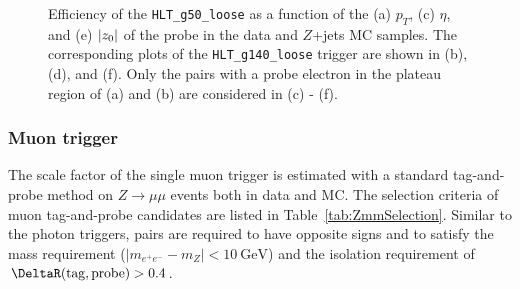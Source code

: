 \begin{figure}[!htb]
    \caption{Efficiency of the \texttt{HLT\_g50\_loose} as a function of the (a) $p_{T}$, (c) $\eta$, and (e) $|z_{0}|$ of the probe in the data and $Z$+jets MC samples. The corresponding plots of the \texttt{HLT\_g140\_loose} trigger are shown in (b), (d), and (f). Only the pairs with a probe electron in the plateau region of (a) and (b) are considered in (c) - (f).
    }
    \label{fig:PhotonTrigEff}
\end{figure}




\subsubsection{Muon trigger}
\label{subsect:muonTrigEff}

The scale factor of the single muon trigger is estimated with a standard tag-and-probe method on $Z \rightarrow \mu\mu$ events both in data and MC. The selection criteria of muon tag-and-probe candidates are listed in Table~\ref{tab:ZmmSelection}. Similar to the photon triggers, pairs are required to have opposite signs and to satisfy the mass requirement ($|m_{e^{+}e^{-}} - m_{Z}| < 10~\si{\GeV}$) and the isolation requirement of $\DeltaR(\mathrm{tag}, \mathrm{probe}) > 0.4$. 

